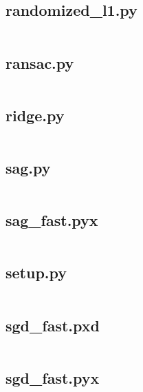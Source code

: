 \documentclass{article}
\begin{document}
\subsection{randomized\_l1.py}
\inputminted{python}{/home/dufferzafar/dev/@clones/scikit-learn/sklearn/linear_model/randomized_l1.py}
\newpage

\subsection{ransac.py}
\inputminted{python}{/home/dufferzafar/dev/@clones/scikit-learn/sklearn/linear_model/ransac.py}
\newpage

\subsection{ridge.py}
\inputminted{python}{/home/dufferzafar/dev/@clones/scikit-learn/sklearn/linear_model/ridge.py}
\newpage

\subsection{sag.py}
\inputminted{python}{/home/dufferzafar/dev/@clones/scikit-learn/sklearn/linear_model/sag.py}
\newpage

\subsection{sag\_fast.pyx}
\inputminted{cython}{/home/dufferzafar/dev/@clones/scikit-learn/sklearn/linear_model/sag_fast.pyx}
\newpage

\subsection{setup.py}
\inputminted{python}{/home/dufferzafar/dev/@clones/scikit-learn/sklearn/linear_model/setup.py}
\newpage

\subsection{sgd\_fast.pxd}
\inputminted{cython}{/home/dufferzafar/dev/@clones/scikit-learn/sklearn/linear_model/sgd_fast.pxd}
\newpage

\subsection{sgd\_fast.pyx}
\inputminted{cython}{/home/dufferzafar/dev/@clones/scikit-learn/sklearn/linear_model/sgd_fast.pyx}
\newpage
\end{document}
